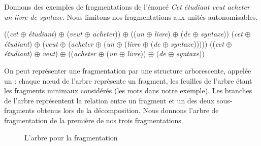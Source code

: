 Donnons des exemples de fragmentations de l’énoncé  \textit{Cet étudiant veut acheter un livre de syntaxe}. Nous limitons nos fragmentations aux unités autonomisables.

\ea
\ea ((\textit{cet} ${\oplus}$ \textit{étudiant}) ${\oplus}$ (\textit{veut} ${\oplus}$ \textit{acheter})) ${\oplus}$ ((\textit{un} ${\oplus}$ \textit{livre}) ${\oplus}$ (\textit{de} ${\oplus}$ \textit{syntaxe}))\label{ex:fragmentation:1}
\ex (\textit{cet} ${\oplus}$ \textit{étudiant}) ${\oplus}$ (\textit{veut} ${\oplus}$ (\textit{acheter} ${\oplus}$ (\textit{un} ${\oplus}$  (\textit{livre} ${\oplus}$ (\textit{de} ${\oplus}$ \textit{syntaxe})))))
\ex ((\textit{cet} ${\oplus}$ \textit{étudiant}) ${\oplus}$  \textit{veut}) ${\oplus}$ ((\textit{acheter} ${\oplus}$ (\textit{un} ${\oplus}$ \textit{livre})) ${\oplus}$ (\textit{de} ${\oplus}$ \textit{syntaxe}))
\z
\z

On peut représenter une fragmentation par une structure arborescente, appelée un  : chaque nœud de l’arbre représente un fragment, les feuilles de l’arbre étant les fragments minimaux considérés (les mots dans notre exemple). Les branches de l’arbre représentent la relation entre un fragment et un des deux sous-fragments obtenus lors de la décomposition. Nous donnons l’arbre de fragmentation de la première de nos trois fragmentations.

\begin{figure}
\caption{\label{fig:}L’arbre pour la fragmentation }
\end{figure}

